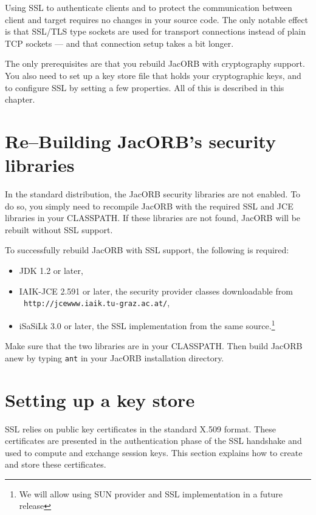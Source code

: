 \documentclass[12pt]{scrbook}
\begin{document}
Using  SSL to authenticate  clients and  to protect  the communication
between client and target requires no changes in your source code. The
only  notable  effect  is  that  SSL/TLS type  sockets  are  used  for
transport  connections  instead of  plain  TCP  sockets  --- and  that
connection setup takes a bit longer.

The only  prerequisites are that you rebuild  JacORB with cryptography
support. You  also need  to set up  a key  store file that  holds your
cryptographic   keys,  and  to   configure  SSL   by  setting   a  few
properties. All of this is described in this chapter.

\section{Re--Building JacORB's security libraries}

In the  standard distribution, the  JacORB security libraries  are not
enabled.   To do  so, you  simply need  to recompile  JacORB  with the
required SSL and JCE libraries  in your CLASSPATH.  If these libraries
are not found, JacORB will be rebuilt without SSL support.

To  successfully rebuild  JacORB with  SSL support,  the  following is
required:

\begin{itemize}
        \item JDK 1.2 or later,
          
        \item IAIK-JCE 2.591 or later, the security provider classes
          downloadable from \\ {\tt
            http://jcewww.iaik.tu-graz.ac.at/},
          
        \item iSaSiLk 3.0 or later, the SSL implementation from the
          same source.\footnote{We will allow using SUN provider and
            SSL implementation in a future release}
\end{itemize}

Make  sure that  the two  libraries are  in your  CLASSPATH. Then build
JacORB anew by typing {\tt ant} in your JacORB installation directory.

\section{Setting up a key store}

SSL  relies   on  public  key  certificates  in   the  standard  X.509
format. These  certificates are presented in  the authentication phase
of the  SSL handshake and used  to compute and  exchange session keys.
This section explains how to create and store these certificates.
\end{document}
